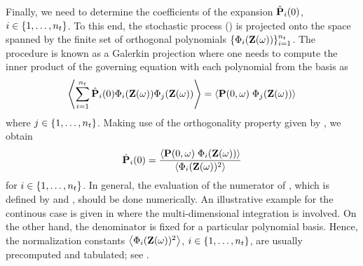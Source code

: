 Finally, we need to determine the coefficients of the expansion $\hat{\mathbf{P}}_i(0)$, $i \in \{ 1, \dotsc, {n_t} \}$. To this end, the stochastic process () is projected onto the space spanned by the finite set of orthogonal polynomials $\{ \Phi_i(\mathbf{Z}(\omega)) \}_{i = 1}^{{n_t}}$. The procedure is known as a Galerkin projection where one needs to compute the inner product of the governing equation  with each polynomial from the basis as
\[
  \left\langle \sum_{i=1}^{{n_t}} \hat{\mathbf{P}}_i(0) \Phi_i(\mathbf{Z}(\omega)) \Phi_j(\mathbf{Z}(\omega)) \right\rangle = \left\langle \mathbf{P}(0, \omega) \; \Phi_j(\mathbf{Z}(\omega)) \right\rangle
\]
where $j \in \{ 1, \dotsc, {n_t} \}$. Making use of the orthogonality property given by , we obtain
\begin{equation} \elabel{pc-coefficients}
  \pcc{\vP}_i(0) = \frac{\oInner{\vP(0, \o) \; \pcb_i(\vZ(\o))}}{\oInner{\pcb_i(\vZ(\o))^2}}
\end{equation}
for $i \in \{ 1, \dotsc, {n_t} \}$. In general, the evaluation of the numerator of , which is defined by  and , should be done numerically. An illustrative example for the continous case is given in  where the multi-dimensional integration is involved. On the other hand, the denominator is fixed for a particular polynomial basis. Hence, the normalization constants $\left\langle \Phi_i(\mathbf{Z}(\omega))^2 \right\rangle$, $i \in \{ 1, \dotsc, {n_t} \}$, are usually precomputed and tabulated; see \cite{ghanem1991}.

